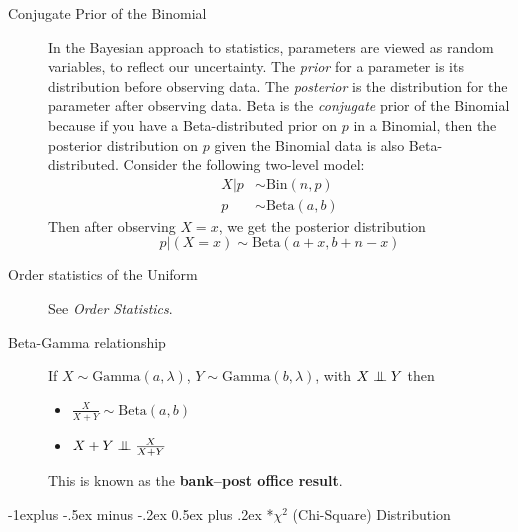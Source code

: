 \documentclass[6pt,landscape]{article}
\makeatletter
\newcommand\independent{\protect\mathpalette{\protect\independenT}{\perp}}
\def\independenT#1#2{\mathrel{\setbox0\hbox{$#1#2$}%
    \copy0\kern-\wd0\mkern4mu\box0}}
\newcommand{\Bin}{\textrm{Bin}}
\newcommand{\Beta}{\textrm{Beta}}
\newcommand{\Gam}{\textrm{Gamma}}
\newcommand{\Expo}{\textrm{Expo}}
\renewcommand{\subsection}{\@startsection{subsection}{2}{0mm}%
                                {-1explus -.5ex minus -.2ex}%
                                {0.5ex plus .2ex}%
                                {\normalfont\normalsize\bfseries}}
\makeatother
\begin{document}
\begin{multicols*}{3}
\begin{description}

\item[Conjugate Prior of the Binomial] In the Bayesian approach to statistics, parameters are viewed as random variables, to reflect our uncertainty. The \emph{prior} for a parameter is its distribution before observing data. The \emph{posterior}  is the distribution for the parameter after observing data. Beta is the \emph{conjugate} prior of the Binomial because if you have a Beta-distributed prior on $p$ in a Binomial, then the posterior distribution on $p$ given the Binomial data is also Beta-distributed. Consider the following two-level model:
    \begin{align*}
        X|p &\sim \Bin(n, p) \\
        p &\sim \Beta(a, b)
    \end{align*}
Then after observing  $X = x$, we get the posterior distribution
\[p|(X=x) \sim \Beta(a + x, b + n - x) \]

\item[Order statistics of the Uniform] See \emph{Order Statistics}.
\item[Beta-Gamma relationship] If $X \sim \Gam(a, \lambda)$, $Y \sim \Gam(b, \lambda)$, with $X \independent Y$ then
    \begin{itemize}
    	\item $\frac{X}{X + Y} \sim \Beta(a, b)$
    	\item $X + Y \independent \frac{X}{X + Y}$
    \end{itemize}
    This is known as the \textbf{bank--post office result}.
\end{description}




\subsection*{$\chi^2$ (Chi-Square) Distribution}


\end{multicols*}
\end{document}
